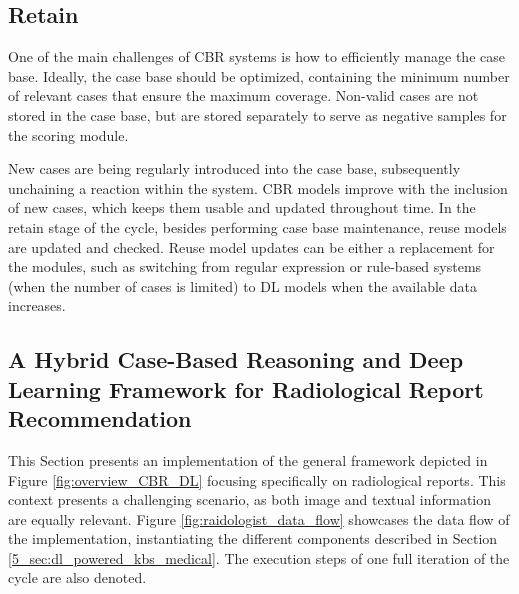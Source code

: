 \subsection*{Retain}\label{5_sec:dl_powered_cbr_retain}
One of the main challenges of CBR systems is how to efficiently manage the case base. Ideally, the case base should be optimized, containing the minimum number of relevant cases that ensure the maximum coverage. Non-valid cases are not stored in the case base, but are stored separately to serve as negative samples for the scoring module. 

New cases are being regularly introduced into the case base, subsequently unchaining a reaction within the system. CBR models improve with the inclusion of new cases, which keeps them usable and updated throughout time. In the retain stage of the cycle, besides performing case base maintenance, reuse models are updated and checked. Reuse model updates can be either a replacement for the modules, such as switching from regular expression or rule-based systems (when the number of cases is limited) to DL models when the available data increases. 

\subsection{A Hybrid Case-Based Reasoning and Deep Learning Framework for Radiological Report Recommendation}\label{5_sec:raidologist}

This Section presents an implementation of the general framework depicted in Figure \ref{fig:overview_CBR_DL} focusing specifically on radiological reports. This context presents a challenging scenario, as both image and textual information are equally relevant. Figure \ref{fig:raidologist_data_flow} showcases the data flow of the implementation, instantiating the different components described in Section \ref{5_sec:dl_powered_kbs_medical}. The execution steps of one full iteration of the cycle are also denoted.

